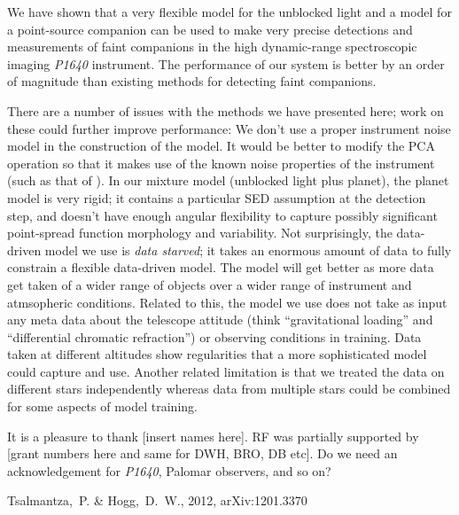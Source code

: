 \documentclass[12pt,pdftex,preprint]{aastex}
\newcommand{\project}[1]{\textsl{#1}}
\begin{document}
We have shown that a very flexible model for the unblocked light and a
model for a point-source companion can be used to make very precise
detections and measurements of faint companions in the high
dynamic-range spectroscopic imaging \project{P1640} instrument.  The
performance of our system is better by an order of magnitude than
existing methods for detecting faint companions.

There are a number of issues with the methods we have presented here;
work on these could further improve performance: We don't use a proper
instrument noise model in the construction of the model.  It would be
better to modify the PCA operation so that it makes use of the known
noise properties of the instrument (such as that of \citealt{hmf}).
In our mixture model (unblocked light plus planet), the planet model
is very rigid; it contains a particular SED assumption at the
detection step, and doesn't have enough angular flexibility to capture
possibly significant point-spread function morphology and variability.
Not surprisingly, the data-driven model we use is \emph{data starved};
it takes an enormous amount of data to fully constrain a flexible
data-driven model.  The model will get better as more data get taken
of a wider range of objects over a wider range of instrument and
atmsopheric conditions.  Related to this, the model we use does not
take as input any meta data about the telescope attitude (think
``gravitational loading'' and ``differential chromatic refraction'')
or observing conditions in training.  Data taken at different
altitudes show regularities that a more sophisticated model could
capture and use.  Another related limitation is that we treated the
data on different stars independently whereas data from multiple stars
could be combined for some aspects of model training.

\acknowledgements It is a pleasure to thank [insert names here].  RF
was partially supported by [grant numbers here and same for DWH, BRO,
  DB etc].  Do we need an acknowledgement for \project{P1640}, Palomar
observers, and so on?

\begin{thebibliography}{}
Tsalmantza,~P. \& Hogg,~D.~W., 2012, arXiv:1201.3370
\end{thebibliography}
\end{document}
